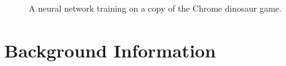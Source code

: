 \begin{figure}\label{fig:ytscreencap}
	\caption{A neural network training on a copy of the Chrome dinosaur game.}
\end{figure}

\section{Background Information}\label{sec:back}

